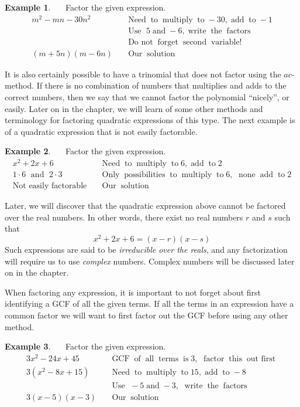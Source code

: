 \documentclass[12pt]{book}
\theoremstyle{definition}
\newtheorem{example}{Example}
\newcommand{\tmop}[1]{\ensuremath{\operatorname{#1}}}
\begin{document}
\begin{example}~~~Factor the given expression.
  \begin{eqnarray*}
    m^2 - m n - 30 n^2 &  & \tmop{Need} \tmop{to} \tmop{multiply} \tmop{to} -
    30, \tmop{add} \tmop{to} - 1\\
    &  & \tmop{Use~}  5 \tmop{and} - 6, \tmop{write} \tmop{the} \tmop{factors}\\
		&& \tmop{Do~not} \tmop{forget} \tmop{second} \tmop{variable!}\\
    (m + 5 n) (m - 6 n) &  & \tmop{Our} \tmop{solution}
  \end{eqnarray*}
\end{example}	
It is also certainly possible to have a trinomial that does not factor using the $ac$-method. If there is no combination of numbers that multiplies and adds to the correct numbers, then we say that we cannot factor the polynomial ``nicely'', or easily.  Later on in the chapter, we will learn of some other methods and terminology for factoring quadratic expressions of this type.  The next example is of a quadratic expression that is not easily factorable.
\begin{example}~~~Factor the given expression.
  \begin{eqnarray*}
    x^2 + 2 x + 6 &  & \tmop{Need} \tmop{to} \tmop{multiply} \tmop{to} 6,
    \tmop{add} \tmop{to} 2\\
    1 \cdot 6 \tmop{~and~} 2 \cdot 3 &  & \tmop{Only} \tmop{possibilities}
    \tmop{to} \tmop{multiply} \tmop{to} 6, \tmop{~none} \tmop{add}
    \tmop{to} 2\\
    \tmop{Not~easily~factorable} &  & \tmop{Our} \tmop{solution}
  \end{eqnarray*}
\end{example}	
Later, we will discover that the quadratic expression above cannot be factored over the real numbers.  In other words, there exist no real numbers $r$ and $s$ such that
  $$x^2 + 2 x + 6=(x-r)(x-s)$$
Such expressions are said to be {\it irreducible over the reals}, and any factorization will require us to use \textit{complex} numbers.  Complex numbers will be discussed later on in the chapter.\par
When factoring any expression, it is important to not forget about first identifying a GCF of all the given terms. If all the terms
in an expression have a common factor we will want to first factor out the GCF before using any other method.
\begin{example}~~~Factor the given expression.
  \begin{eqnarray*}
    3 x^2 - 24 x + 45 &  & \tmop{GCF} \tmop{of} \tmop{all} \tmop{terms}
    \tmop{is} 3, \tmop{~factor} \tmop{this} \tmop{out~first}\\
    3 (x^2 - 8 x + 15) &  & \tmop{Need} \tmop{to} \tmop{multiply} \tmop{to}
    15, \tmop{add} \tmop{to} - 8\\
    &  &\tmop{Use~} - 5 \tmop{and} - 3, \tmop{~write} \tmop{the} \tmop{factors}\\
    3 (x - 5) (x - 3) &  & \tmop{Our} \tmop{solution}
  \end{eqnarray*}
\end{example}	
\end{document}
